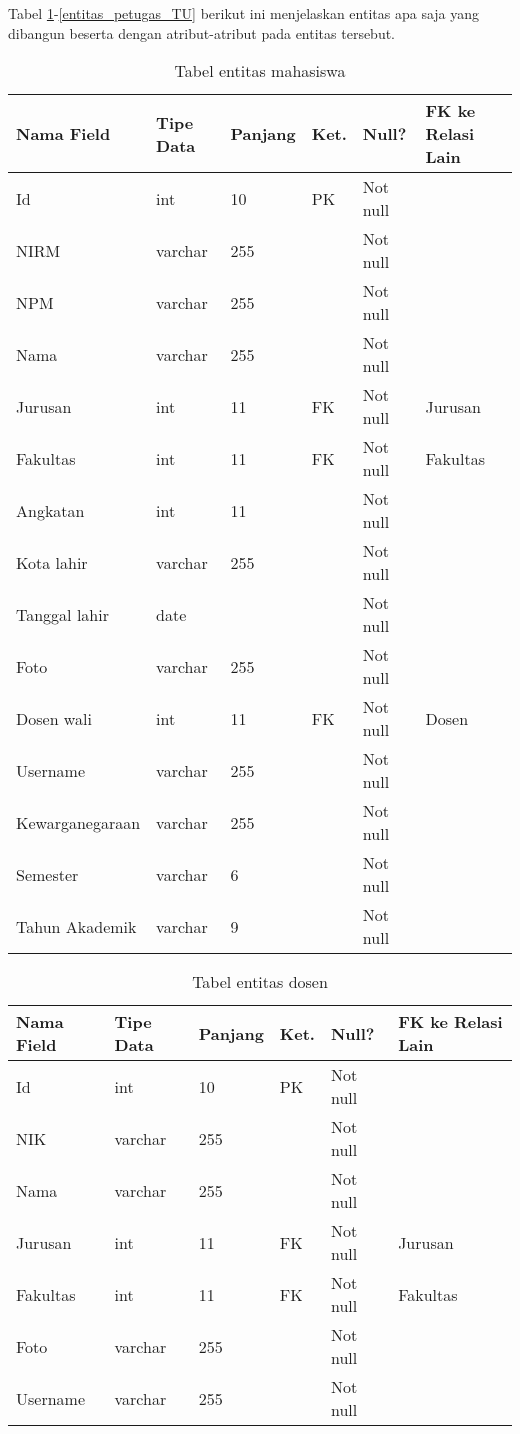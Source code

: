 Tabel \ref{entitas_mahasiswa}-\ref{entitas_petugas_TU} berikut ini menjelaskan entitas apa saja yang dibangun beserta dengan atribut-atribut pada entitas tersebut.

\begin{table}[H]
\centering
\caption{Tabel entitas mahasiswa}
\label{entitas_mahasiswa}
\begin{tabular}{|l|l|l|l|l|l|}
\hline
\textbf{Nama Field}&\textbf{Tipe Data}&\textbf{Panjang}&\textbf{Ket.}&\textbf{Null?}&\textbf{FK ke Relasi Lain}\\ \hline
Id&int&10&PK&Not null&\\ \hline
NIRM&varchar&255&&Not null&\\ \hline
NPM&varchar&255&&Not null&\\ \hline
Nama&varchar&255&&Not null&\\ \hline
Jurusan&int&11&FK&Not null&Jurusan\\ \hline
Fakultas&int&11&FK&Not null&Fakultas\\ \hline
Angkatan&int&11&&Not null&\\ \hline
Kota lahir&varchar&255&&Not null&\\ \hline
Tanggal lahir&date&&&Not null&\\ \hline
Foto&varchar&255&&Not null&\\ \hline
Dosen wali&int&11&FK&Not null&Dosen\\ \hline
Username&varchar&255&&Not null&\\ \hline
Kewarganegaraan&varchar&255&&Not null&\\ \hline
Semester&varchar&6&&Not null&\\ \hline
Tahun Akademik&varchar&9&&Not null&\\ \hline
\end{tabular}
\end{table}

\begin{table}[H]
\centering
\caption{Tabel entitas dosen}
\label{entitas_dosen}
\begin{tabular}{|l|l|l|l|l|l|}
\hline
\textbf{Nama Field}&\textbf{Tipe Data}&\textbf{Panjang}&\textbf{Ket.}&\textbf{Null?}&\textbf{FK ke Relasi Lain}\\ \hline
Id&int&10&PK&Not null&\\ \hline
NIK&varchar&255&&Not null&\\ \hline
Nama&varchar&255&&Not null&\\ \hline
Jurusan&int&11&FK&Not null&Jurusan\\ \hline
Fakultas&int&11&FK&Not null&Fakultas\\ \hline
Foto&varchar&255&&Not null&\\ \hline
Username&varchar&255&&Not null&\\ \hline
\end{tabular}
\end{table}

